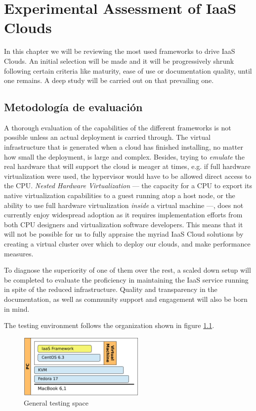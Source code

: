 \chapter{Experimental Assessment of IaaS Clouds}\label{cap:evaliaas}

\noindent In this chapter we will be reviewing the most used frameworks to drive IaaS Clouds. An initial selection will be made and it will be progressively shrunk following certain criteria like maturity, ease of use or documentation quality, until one remains. A deep study will be carried out on that prevailing one.

\section{Metodolog\'ia de evaluaci\'on}\label{sec:evaluacion}

\noindent A thorough evaluation of the capabilities of the different frameworks is not possible unless an actual deployment is carried through. The virtual infrastructure that is generated when a cloud has finished installing, no matter how small the deployment, is large and complex. Besides, trying to \emph{emulate} the real hardware that will support the cloud is meager at times, e.g. if full hardware virtualization were used, the hypervisor would have to be allowed direct access to the CPU. \emph{Nested Hardware Virtualization} --- the capacity for a CPU to export its native virtualization capabilities to a guest running atop a host node, or the ability to use full hardware virtualization \emph{inside} a virtual machine ---, does not currently enjoy widespread adoption as it requires implementation efforts from both CPU designers and virtualization software developers. This means that it will not be possible for us to fully appraise the myriad IaaS Cloud solutions by creating a virtual cluster over which to deploy our clouds, and make performance measures.

To diagnose the superiority of one of them over the rest, a scaled down setup will be completed to evaluate the proficiency in maintaining the IaaS service running in spite of the reduced infrastructure. Quality and transparency in the documentation, as well as community support and engagement will also be born in mind.

The testing environment follows the organization shown in figure \ref{fig:espacioprueba}.

\begin{figure}[tbp]
\begin{center}
\includegraphics[width=0.55\textwidth]{imagenes/007.pdf}
 \caption{General testing space}
\label{fig:espacioprueba}
\end{center}
\end{figure}

